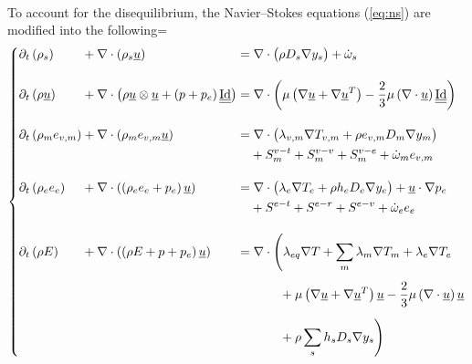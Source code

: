       \paragraph{}
      To account for the disequilibrium, the Navier--Stokes equations (\ref{eq:ns}) are modified into the following=
      \begin{equation}
        \left\{\begin{alignedat}{5}
          &\partial_t\left(  \rho_s  \right) &&+ \nabla\cdot\left(  \rho_s \vec{u}  \right) &&=
            \nabla\cdot\bigl( \rho D_s \nabla y_s\bigr) + \dot \omega_s \\[10pt]
          &\partial_t\left(  \rho \vec{u}  \right) &&+ \nabla\cdot\left(  \rho \vec{u} \otimes \vec{u}  +  \left(p + p_e\right) \mat{\operatorname{Id}}  \right) &&=
            \nabla\cdot\biggl(
              \mu \left(\nabla \vec{u} + \nabla \vec{u}^T\right)
              - \frac{2}{3} \mu \left(\nabla \cdot \vec{u} \right) \mat{\operatorname{Id}}
            \biggr) \\[10pt]
          &\partial_t\left(  \rho_m e_{v,m}  \right) &&+ \nabla\cdot\left(  \rho_m e_{v,m} \vec{u}  \right) &&=
            \nabla\cdot\bigl(
              \lambda_{v,m} \nabla T_{v,m}
              + \rho e_{v,m} D_m \nabla y_m
            \bigr) \\
            &&&&& \phantom{= {}} + S^{v-t}_m + S^{v-v}_m + S^{v-e}_m + \dot \omega_m e_{v,m} \\[10pt]
          &\partial_t\left(  \rho_e e_e  \right) &&+ \nabla\cdot\left(  \left(\rho_e e_e + p_e\right) \vec{u}  \right) &&=
            \nabla\cdot\bigl(
              \lambda_e \nabla T_e
              + \rho h_e D_e \nabla y_e
            \bigr)
            + \vec{u} \cdot \nabla p_e \\
            &&&&& \phantom{= {}} + S^{e-t} + S^{e-r} + S^{e-v} + \dot \omega_e e_e \\[10pt]
          &\partial_t\left(  \rho E  \right) &&+ \nabla\cdot\left(  \left(\rho E + p + p_e\right) \vec{u}  \right) &&=
            \nabla\cdot\Biggl(
              \lambda_{eq} \nabla T
              + \sum_m \lambda_m \nabla T_m
              + \lambda_e \nabla T_e \\
              &&&&& \phantom{=\nabla\cdot\Biggl(} + \mu \left(\nabla \vec{u} + \nabla \vec{u}^T\right) \vec{u} - \frac{2}{3} \mu \left(\nabla \cdot \vec{u}\right) \vec{u} \\
              &&&&& \phantom{=\nabla\cdot\Biggl(} + \rho \sum_s h_s D_s \nabla y_s
            \Biggr)
        \end{alignedat}\right.
      \end{equation}
